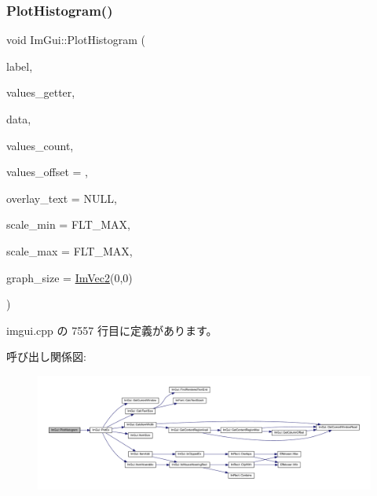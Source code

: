 \subsubsection{\texorpdfstring{Plot\+Histogram()}{PlotHistogram()}\hspace{0.1cm}{\footnotesize\ttfamily [2/2]}}
{\footnotesize\ttfamily void Im\+Gui\+::\+Plot\+Histogram (\begin{DoxyParamCaption}\item[{const char $\ast$}]{label,  }\item[{float($\ast$)(void $\ast$data, int idx)}]{values\+\_\+getter,  }\item[{void $\ast$}]{data,  }\item[{int}]{values\+\_\+count,  }\item[{int}]{values\+\_\+offset = {},  }\item[{const char $\ast$}]{overlay\+\_\+text = {\ttfamily NULL},  }\item[{float}]{scale\+\_\+min = {\ttfamily FLT\+\_\+MAX},  }\item[{float}]{scale\+\_\+max = {\ttfamily FLT\+\_\+MAX},  }\item[{\mbox{\hyperlink{struct_im_vec2}{Im\+Vec2}}}]{graph\+\_\+size = {\ttfamily \mbox{\hyperlink{struct_im_vec2}{Im\+Vec2}}(0,0)} }\end{DoxyParamCaption})}



 imgui.\+cpp の 7557 行目に定義があります。

呼び出し関係図\+:\nopagebreak
\begin{figure}[H]
\begin{center}
\leavevmode
\includegraphics[width=350pt]{namespace_im_gui_af8089203baf8cf723a158c9e34bda2a4_cgraph}
\end{center}
\end{figure}
\mbox{\label{namespace_im_gui_a2bc21c56e4796855313804086cca114f}} 
